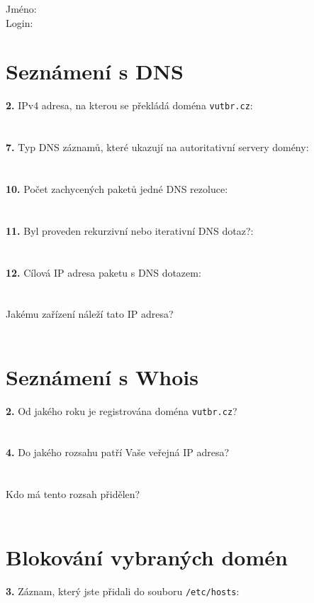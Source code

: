 Jméno:\\
Login:\\

\section{Seznámení s DNS}
\textbf{2.} IPv4 adresa, na kterou se překládá doména {\tt vutbr.cz}:\\
\\
\\
\textbf{7.} Typ DNS záznamů, které ukazují na autoritativní servery domény:\\
\\
\\
\textbf{10.} Počet zachycených paketů jedné DNS rezoluce: \\
\\
\\
\textbf{11.} Byl proveden rekurzivní nebo iterativní DNS dotaz?:\\
\\
\\
\textbf{12.} Cílová IP adresa paketu s DNS dotazem:\\
\\
\\
Jakému zařízení náleží tato IP adresa?\\
\\


\section{Seznámení s Whois}
\textbf{2.} Od jakého roku je registrována doména {\tt vutbr.cz}?\\
\\
\\
\textbf{4.} Do jakého rozsahu patří Vaše veřejná IP adresa?\\
\\
\\
Kdo má tento rozsah přidělen?\\
\\


\section{Blokování vybraných domén}

\textbf{3.} Záznam, který jste přidali do souboru {\tt /etc/hosts}:\\
\\
\\
\\
\\
\\
\\

